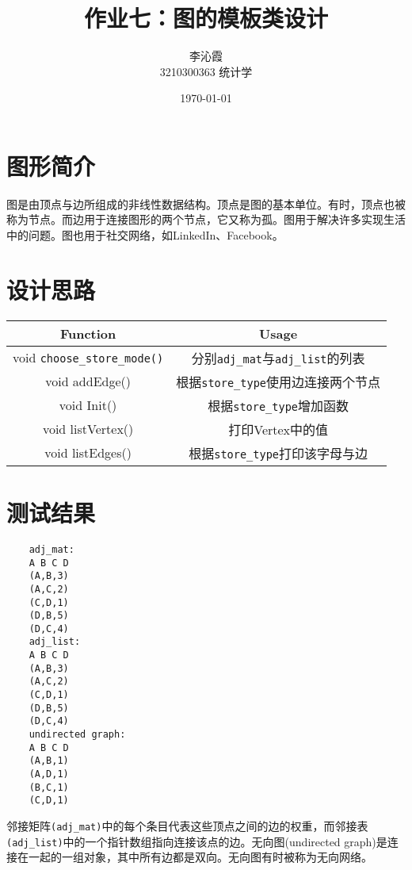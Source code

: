 \documentclass[a4paper]{article}
\title{\textbf{作业七：图的模板类设计}}
\author{李沁霞 \\ 3210300363 统计学}
\date{\today}
\begin{document}
\maketitle

\section{图形简介}
图是由顶点与边所组成的非线性数据结构。顶点是图的基本单位。有时，顶点也被称为节点。而边用于连接图形的两个节点，它又称为孤。图用于解决许多实现生活中的问题。图也用于社交网络，如LinkedIn、Facebook。

\section{设计思路}
\begin{tabular}{|c|c|}
    \hline
     Function &  Usage \\
     \hline
     void \texttt{choose\_store\_mode()} &  分别\texttt{adj\_mat}与\texttt{adj\_list}的列表 \\
     \hline
     void addEdge()  &  根据\texttt{store\_type}使用边连接两个节点 \\
     \hline
     void Init() &  根据\texttt{store\_type}增加函数 \\
     \hline
     void listVertex() & 打印Vertex中的值 \\
     \hline
     void listEdges() & 根据\texttt{store\_type}打印该字母与边 \\
     \hline
\end{tabular}

\section{测试结果}
\begin{lstlisting}
    adj_mat:
    A B C D
    (A,B,3)
    (A,C,2)
    (C,D,1)
    (D,B,5)
    (D,C,4)
    adj_list:
    A B C D
    (A,B,3)
    (A,C,2)
    (C,D,1)
    (D,B,5)
    (D,C,4)
    undirected graph:
    A B C D
    (A,B,1)
    (A,D,1)
    (B,C,1)
    (C,D,1)
\end{lstlisting}
邻接矩阵\texttt{(adj\_mat)}中的每个条目代表这些顶点之间的边的权重，而邻接表\texttt{(adj\_list)}中的一个指针数组指向连接该点的边。无向图(undirected graph)是连接在一起的一组对象，其中所有边都是双向。无向图有时被称为无向网络。
\end{document}
